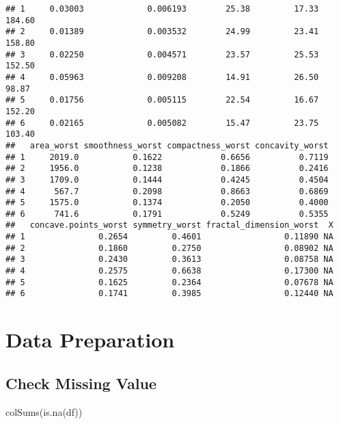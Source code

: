 \documentclass[
]{article}
\newenvironment{Shaded}{\begin{snugshade}}{\end{snugshade}}
\newcommand{\FunctionTok}[1]{\textcolor[rgb]{0.00,0.00,0.00}{#1}}
\newcommand{\NormalTok}[1]{#1}
\begin{document}
\begin{verbatim}
## 1     0.03003             0.006193        25.38         17.33          184.60
## 2     0.01389             0.003532        24.99         23.41          158.80
## 3     0.02250             0.004571        23.57         25.53          152.50
## 4     0.05963             0.009208        14.91         26.50           98.87
## 5     0.01756             0.005115        22.54         16.67          152.20
## 6     0.02165             0.005082        15.47         23.75          103.40
##   area_worst smoothness_worst compactness_worst concavity_worst
## 1     2019.0           0.1622            0.6656          0.7119
## 2     1956.0           0.1238            0.1866          0.2416
## 3     1709.0           0.1444            0.4245          0.4504
## 4      567.7           0.2098            0.8663          0.6869
## 5     1575.0           0.1374            0.2050          0.4000
## 6      741.6           0.1791            0.5249          0.5355
##   concave.points_worst symmetry_worst fractal_dimension_worst  X
## 1               0.2654         0.4601                 0.11890 NA
## 2               0.1860         0.2750                 0.08902 NA
## 3               0.2430         0.3613                 0.08758 NA
## 4               0.2575         0.6638                 0.17300 NA
## 5               0.1625         0.2364                 0.07678 NA
## 6               0.1741         0.3985                 0.12440 NA
\end{verbatim}

\hypertarget{data-preparation}{%
\section{Data Preparation}\label{data-preparation}}

\hypertarget{check-missing-value}{%
\subsection{Check Missing Value}\label{check-missing-value}}

\begin{Shaded}
\begin{Highlighting}[]
\FunctionTok{colSums}\NormalTok{(}\FunctionTok{is.na}\NormalTok{(df))}
\end{Highlighting}
\end{Shaded}
\end{document}
